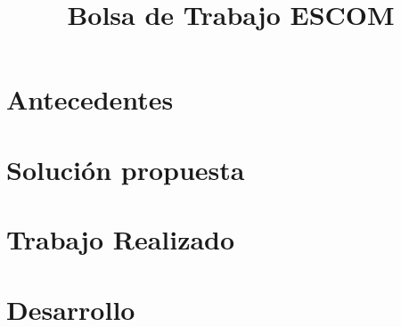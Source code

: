 \documentclass[11pt, twopages]{book}
\date{}
\title{Bolsa de Trabajo ESCOM}
\author{}
\begin{document}
    \frontmatter
        \maketitle
        \tableofcontents
        \listoffigures
        \listoftables
    \mainmatter
    

    
    \label{aloneparts:intro}

    \chapter{Antecedentes}
    
    \label{aloneparts:antecedentes}
        

    \chapter{Solución propuesta}
       \label{aloneparts:propuesta}
       
    
    \chapter{Trabajo Realizado}
    \label{sprints}
       
       
       
       
       
       
       
    
    
        
    
    \chapter{Desarrollo}
       
        
    \appendix

        
        
        
        
        
        

    \medskip

    \printbibliography
        \printbibliography
\end{document}
